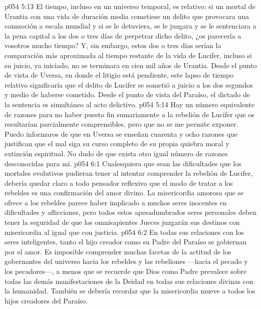 \vs p054 5:13 El tiempo, incluso en un universo temporal, es relativo: si un mortal de Urantia con una vida de duración media cometiese un delito que provocara una conmoción a escala mundial y si se le detuviera, se le juzgara y se le sentenciara a la pena capital a los dos o tres días de perpetrar dicho delito, ¿os parecería a vosotros mucho tiempo? Y, sin embargo, estos dos o tres días serían la comparación más aproximada al tiempo restante de la vida de Lucifer, incluso si su juicio, ya iniciado, no se terminara en cien mil años de Urantia. Desde el punto de vista de Uversa, en donde el litigio está pendiente, este lapso de tiempo relativo significaría que el delito de Lucifer se sometió a juicio a los dos segundos y medio de haberse cometido. Desde el punto de vista del Paraíso, el dictado de la sentencia es simultáneo al acto delictivo.
\vs p054 5:14 \pc Hay un número equivalente de razones para no haber puesto fin sumariamente a la rebelión de Lucifer que os resultarían parcialmente comprensibles, pero que no se me permite exponer. Puedo informaros de que en Uversa se enseñan cuarenta y ocho razones que justifican que el mal siga su curso completo de su propia quiebra moral y extinción espiritual. No dudo de que exista otro igual número de razones desconocidas para mí.
\vs p054 6:1 Cualesquiera que sean las dificultades que los mortales evolutivos pudieran tener al intentar comprender la rebelión de Lucifer, debería quedar claro a todo pensador reflexivo que el modo de tratar a los rebeldes es una confirmación del amor divino. La misericordia amorosa que se ofrece a los rebeldes parece haber implicado a muchos seres inocentes en dificultades y aflicciones, pero todos estos apesadumbrados seres personales deben tener la seguridad de que los omnisapientes Jueces juzgarán sus destinos con misericordia al igual que con justicia.
\vs p054 6:2 En todas sus relaciones con los seres inteligentes, tanto el hijo creador como su Padre del Paraíso se gobiernan por el amor. Es imposible comprender muchas facetas de la actitud de los gobernantes del universo hacia los rebeldes y las rebeliones ---hacia el pecado y los pecadores---, a menos que se recuerde que Dios como Padre prevalece sobre todas las demás manifestaciones de la Deidad en todas sus relaciones divinas con la humanidad. También se debería recordar que la misericordia mueve a todos los hijos creadores del Paraíso.
